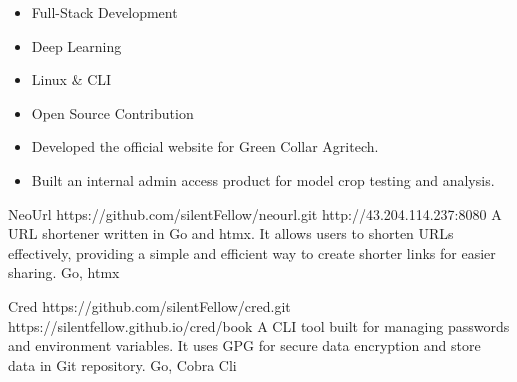 \documentclass[10pt,a4paper,ragged2e,withhyper]{altacv}
\begin{document}
\begin{paracol}{2}

\begin{itemize}
    \item Full-Stack Development
    \item Deep Learning
    \item Linux \& CLI
    \item Open Source Contribution
\end{itemize}



\begin{itemize}
\item Developed the official website for Green Collar Agritech.
\item Built an internal admin access product for model crop testing and analysis.
\end{itemize}


\cvproject
  {NeoUrl}
  {https://github.com/silentFellow/neourl.git}
  {http://43.204.114.237:8080}
  {}
  {A URL shortener written in Go and htmx. It allows users to shorten URLs effectively, providing a simple and efficient way to create shorter links for easier sharing.}
  {Go, htmx}

\divider

\cvproject
  {Cred}
  {https://github.com/silentFellow/cred.git}
  {https://silentfellow.github.io/cred/book}
  {}
  {A CLI tool built for managing passwords and environment variables. It uses GPG for secure data encryption and store data in Git repository.}
  {Go, Cobra Cli}


\end{paracol}
\end{document}
